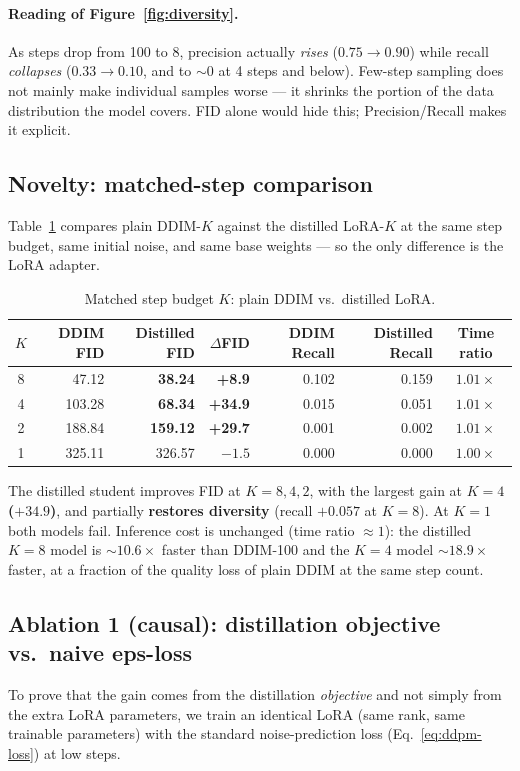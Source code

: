 \documentclass[11pt]{article}
\begin{document}
\paragraph{Reading of Figure~\ref{fig:diversity}.} As steps drop from 100 to 8, precision
actually \emph{rises} ($0.75\!\rightarrow\!0.90$) while recall \emph{collapses}
($0.33\!\rightarrow\!0.10$, and to ${\sim}0$ at 4 steps and below). Few-step sampling does
not mainly make individual samples worse --- it shrinks the portion of the data distribution
the model covers. FID alone would hide this; Precision/Recall makes it explicit.

\subsection{Novelty: matched-step comparison}
Table~\ref{tab:paired} compares plain DDIM-$K$ against the distilled LoRA-$K$ at the same
step budget, same initial noise, and same base weights --- so the only difference is the
LoRA adapter.

\begin{table}[H]
\centering
\caption{Matched step budget $K$: plain DDIM vs.\ distilled LoRA.}
\label{tab:paired}
\begin{tabular}{crrrrrc}
\toprule
$K$ & DDIM FID & Distilled FID & $\Delta$FID & DDIM Recall & Distilled Recall & Time ratio \\
\midrule
8 & 47.12  & \textbf{38.24} & \textbf{+8.9}  & 0.102 & 0.159 & $1.01\times$ \\
4 & 103.28 & \textbf{68.34} & \textbf{+34.9} & 0.015 & 0.051 & $1.01\times$ \\
2 & 188.84 & \textbf{159.12}& \textbf{+29.7} & 0.001 & 0.002 & $1.01\times$ \\
1 & 325.11 & 326.57 & $-1.5$ & 0.000 & 0.000 & $1.00\times$ \\
\bottomrule
\end{tabular}
\end{table}

The distilled student improves FID at $K=8,4,2$, with the largest gain at
\textbf{$K=4$ ($+34.9$)}, and partially \textbf{restores diversity} (recall $+0.057$ at
$K=8$). At $K=1$ both models fail. Inference cost is unchanged (time ratio $\approx 1$):
the distilled $K=8$ model is ${\sim}10.6\times$ faster than DDIM-100 and the $K=4$ model
${\sim}18.9\times$ faster, at a fraction of the quality loss of plain DDIM at the same step
count.

\subsection{Ablation 1 (causal): distillation objective vs.\ naive eps-loss}
To prove that the gain comes from the distillation \emph{objective} and not simply from the
extra LoRA parameters, we train an identical LoRA (same rank, same trainable parameters) with
the standard noise-prediction loss (Eq.~\eqref{eq:ddpm-loss}) at low steps.
\end{document}
